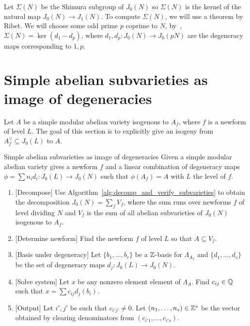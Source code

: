 Let $\Sigma(N)$ be the Shimura subgroup of $J_0(N)$ so $\Sigma(N)$ is the
kernel of the natural map $J_0(N)\to J_1(N)$. To compute $\Sigma(N)$, we will
use a theorem by Ribet. We will choose some odd prime $p$ coprime to $N$,
by~\cite[Prop. 1]{ribet:raising}, $\Sigma(N)=\ker(d_1-d_p)$, where
$d_1,d_p:J_0(N)\to J_0(pN)$ are the degeneracy maps corresponding to $1,p$.

\section{Simple abelian subvarieties as image of degeneracies}

Let $A$ be a simple modular abelian variety isogenous to $A_f$, where $f$ is a
newform of level $L$. The goal of this section is to explicitly give an isogeny
from $A_f ^\vee\subseteq J_0(L)$ to $A$.
\begin{algorithm}{Simple abelian subvarieties as image of degeneracies}%
    \label{alg:simple_degen}
    Given a simple modular abelian variety
    gives a newform $f$ and a linear combination of degeneracy maps
    $\phi=\sum n_i d_i:J_0(L)\to J_0(N)$ such that $\phi(A_f)=A$ with $L$ the
    level of $f$.
    \begin{enumerate}
        \item{} [Decompose]
            Use Algorithm~\ref{alg:decomp_and_verify_subvarieties} to obtain
            the decomposition $J_0(N)=\sum_f V_f$, where the sum runs over
            newforms $f$ of level dividing $N$ and $V_f$ is the sum of all
            abelian subvarieties of $J_0(N)$ isogenous to $A_f$.
        \item{} [Determine newform]
            Find the newform $f$ of level $L$ so that $A\subseteq V_f$.
        \item{} [Basis under degeneracy]
            Let $\{b_1,\ldots,b_r\}$ be a $\mathbb{Z}$-basis for $\Lambda_{A_f}$ and
            $\{d_1,\ldots,d_s\}$ be the set of degeneracy maps $d_j:J_0(L)\to
            J_0(N)$.
        \item{} [Solve system]
            Let $x$ be any nonzero element element of $\Lambda_A$. Find
            $c_{ij}\in \mathbb{Q}$ such that $x=\sum c_{ij} d_j(b_i)$.
        \item{} [Output]
            Let $i', j'$ be such that $c_{i'j'}\neq 0$. Let
            $(n_1,\ldots,n_s)\in \mathbb{Z}^s$ be the vector obtained by
            clearing denominators from $(c_{i'1},\ldots,c_{i's})$.
    \end{enumerate}
\end{algorithm}


